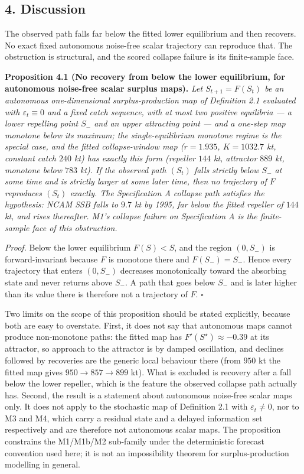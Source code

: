 \documentclass[11pt]{article}
\begin{document}
\subsection{4. Discussion}\label{discussion}

The observed path falls far below the fitted lower equilibrium and then
recovers. No exact fixed autonomous noise-free scalar trajectory can
reproduce that. The obstruction is structural, and the scored collapse
failure is its finite-sample face.

\textbf{Proposition 4.1 (No recovery from below the lower equilibrium,
for autonomous noise-free scalar surplus maps).} \emph{Let
\(S_{t+1}=F(S_t)\) be an autonomous one-dimensional surplus-production
map of Definition 2.1 evaluated with \(\varepsilon_t \equiv 0\) and a
fixed catch sequence, with at most two positive equilibria --- a lower
repelling point \(S_-\) and an upper attracting point --- and a one-step
map monotone below its maximum; the single-equilibrium monotone regime
is the special case, and the fitted collapse-window map (\(r = 1.935\),
\(K = 1032.7\) kt, constant catch \(240\) kt) has exactly this form
(repeller \(144\) kt, attractor \(889\) kt, monotone below \(783\) kt).
If the observed path \((S_t)\) falls strictly below \(S_-\) at some
time and is strictly larger at some later time, then no trajectory of
\(F\) reproduces \((S_t)\) exactly. The Specification A collapse path
satisfies the hypothesis: NCAM SSB falls to \(9.7\) kt by 1995, far
below the fitted repeller of \(144\) kt, and rises thereafter. M1's
collapse failure on Specification A is the finite-sample face of this
obstruction.}

\emph{Proof.} Below the lower equilibrium \(F(S) < S\), and the region
\((0, S_-)\) is forward-invariant because \(F\) is monotone there and
\(F(S_-) = S_-\). Hence every trajectory that enters \((0, S_-)\)
decreases monotonically toward the absorbing state and never returns
above \(S_-\). A path that goes below \(S_-\) and is later higher than
its value there is therefore not a trajectory of \(F\).
\ensuremath{\square}

Two limits on the scope of this proposition should be stated
explicitly, because both are easy to overstate. First, it does not say
that autonomous maps cannot produce non-monotone paths: the fitted map
has \(F'(S^\star) \approx -0.39\) at its attractor, so approach to the
attractor is by damped oscillation, and declines followed by recoveries
are the generic local behaviour there (from \(950\) kt the fitted map
gives \(950 \to 857 \to 899\) kt). What is excluded is recovery after a
fall below the lower repeller, which is the feature the observed
collapse path actually has. Second, the result is a statement about
autonomous noise-free scalar maps only. It does not apply to the
stochastic map of Definition 2.1 with \(\varepsilon_t \neq 0\), nor to
M3 and M4, which carry a residual state and a delayed information set
respectively and are therefore not autonomous scalar maps. The
proposition constrains the M1/M1b/M2 sub-family under the deterministic
forecast convention used here; it is not an impossibility theorem for
surplus-production modelling in general.
\end{document}
